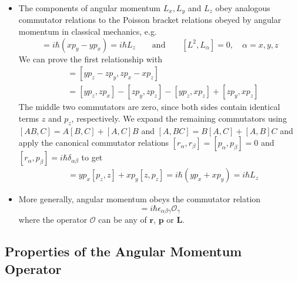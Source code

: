 \documentclass[11pt, a4paper]{article}
\newcommand{\eqtext}[1]{\qquad \text{#1} \qquad}
\renewcommand{\vec}[1]{\bm{#1}}  %
\renewcommand{\r}{\vec{r}}  %
\renewcommand{\L}{\vec{L}}  %
\renewcommand{\O}{\mathcal{O}}  %
\begin{document}
\begin{itemize}
	\item The components of angular momentum $ L_{x}, L_{y} $ and $ L_{z} $ obey analogous commutator relations to the Poisson bracket relations obeyed by angular momentum in classical mechanics, e.g.
	\begin{equation*}
		[L_{x}, L_{y}] = i\hbar(xp_{y} - yp_{x}) = i\hbar L_{z} \eqtext{and} [L^{2}, L_{\alpha}] = 0, \quad \alpha = x, y, z
	\end{equation*}
	We can prove the first relationship with
	\begin{align*}
		[L_{x}, L_{y}] &= [yp_{z} - zp_{y}, zp_{x} - xp_{z}]\\
		& = [yp_{z}, zp_{x}] - [zp_{y}, zp_{z}] - [yp_{z}, xp_{z}] + [zp_{y}, xp_{z}]
	\end{align*}
	The middle two commutators are zero, since both sides contain identical terms $ z $ and $ p_{z} $, respectively. We expand the remaining commutators using $ [AB, C] = A[B, C] + [A, C]B $ and $ [A, BC] = B[A, C] + [A, B]C $ and apply the canonical commutator relations $ [r_{\alpha}, r_{\beta}] = [p_{\alpha}, p_{\beta}] = 0 $ and $ [r_{\alpha}, p_{\beta}] = i\hbar \delta_{\alpha \beta} $ to get
	\begin{align*}
		[L_{x}, L_{y}] &= yp_{x}[p_{z}, z] + xp_{y}[z, p_{z}] = i\hbar (yp_{x} + xp_{y}) = i\hbar L_{z}
	\end{align*}

	
	\item More generally, angular momentum obeys the commutator relation
	\begin{equation*}
		[L_{\alpha}, \O_{\beta}] = i \hbar \epsilon_{\alpha \beta \gamma}\O_{\gamma}
	\end{equation*}
	where the operator $ \O $ can be any of $ \r $, $\vec{p}$ or $ \L $.
	
\end{itemize}

\subsection{Properties of the Angular Momentum Operator}
\end{document}
